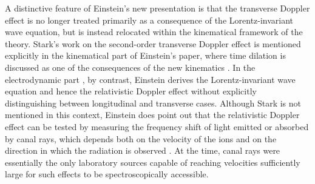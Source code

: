\documentclass[submitted,12pt]{article} %
\begin{document}
A distinctive feature of Einstein’s new presentation is that the transverse Doppler effect is no longer treated primarily as a consequence of the Lorentz-invariant wave equation, but is instead relocated within the kinematical framework of the theory. Stark’s work on the second-order transverse Doppler effect is mentioned explicitly in the kinematical part  of Einstein’s paper, where time dilation is discussed as one of the consequences of the new kinematics \citep[422]{Einstein1908}. In the electrodynamic part , by contrast, Einstein derives the Lorentz-invariant wave equation and hence the relativistic Doppler effect without explicitly distinguishing between longitudinal and transverse cases. Although Stark is not mentioned in this context, Einstein does point out that the relativistic Doppler effect can be tested by measuring the frequency shift of light emitted or absorbed by canal rays, which depends both on the velocity of the ions and on the direction in which the radiation is observed \citep[425]{Einstein1907a}. At the time, canal rays were essentially the only laboratory sources capable of reaching velocities sufficiently large for such effects to be spectroscopically accessible.



\end{document}
